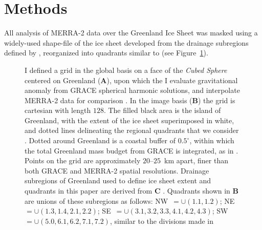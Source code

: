 \documentclass[11pt]{report}
\begin{document}
 \section{Methods}
 
All analysis of MERRA-2 data over the Greenland Ice Sheet was masked using a widely-used shape-file of the ice sheet developed from the drainage subregions defined by \cite{zwally2012}, reorganized into quadrants similar to \cite{mcmillan2016} (see Figure~\ref{fig:gridbasins}).

\begin{figure}[h]
\centering
{}
\caption[The Discrete Grid Around Greenland]{I defined a grid in the global basis on a face of the \textit{Cubed Sphere} centered on Greenland (\textbf{A}), upon which the I evaluate gravitational anomaly from GRACE spherical harmonic solutions, and interpolate MERRA-2 data for comparison \cite[see][]{ronchi1996}. In the image basis (\textbf{B}) the grid is cartesian with length $128$. The filled black area is the island of Greenland, with the extent of the ice sheet superimposed in white, and dotted lines delineating the regional quadrants that we consider \cite[see \textbf{C}~\&][]{zwally2012}. Dotted around Greenland is a coastal buffer of $0.5^{\circ}$, within which the total Greenland mass budget from GRACE is integrated, as in \cite{Harig+2016}. Points on the grid are approximately $20$--$25$~km apart, finer than both GRACE and MERRA-2 spatial resolutions. Drainage subregions of Greenland used to define ice sheet extent and quadrants in this paper are derived from \textbf{C} \cite[figure and data from][]{zwally2012}. Quadrants shown in \textbf{B} are unions of these subregions as follows: NW~$=\cup(1.1, 1.2)$; NE~$=\cup(1.3, 1.4, 2.1, 2.2)$; SE~$=\cup(3.1, 3.2, 3.3, 4.1, 4.2, 4.3)$; SW~$=\cup(5.0,6.1,6.2,7.1,7.2)$, similar to the divisions made in \cite{mcmillan2016} \label{fig:gridbasins}}
\end{figure}
\end{document}
